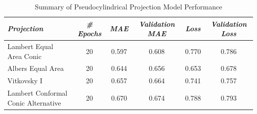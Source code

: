 \begin{table}[H]
    \centering
    \caption{Summary of Pseudocylindrical Projection Model Performance}
    \label{conic_results_table}
    \renewcommand{\arraystretch}{1.2} %
    \begin{tabular}{|l|c|c|c|c|c|}
        \hline
        \rowcolor[gray]{0.9}
        \textbf{\emph{Projection}}          & \textbf{\emph{\# Epochs}} & \textbf{\emph{MAE}} & \textbf{\emph{Validation MAE}} & \textbf{\emph{Loss}} & \textbf{\emph{Validation Loss}} \\ \hline
        Lambert Equal Area Conic            & 20                        & 0.597               & 0.608                          & 0.770                & 0.786                           \\ \hline
        Albers Equal Area                   & 20                        & 0.644               & 0.656                          & 0.653                & 0.678                           \\ \hline
        Vitkovsky I                         & 20                        & 0.657               & 0.664                          & 0.741                & 0.757                           \\ \hline
        Lambert Conformal Conic Alternative & 20                        & 0.670               & 0.674                          & 0.788                & 0.793                           \\ \hline
    \end{tabular}
\end{table}
